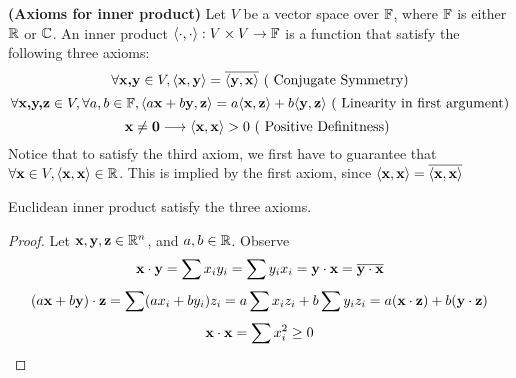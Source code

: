 \documentclass{report}
\begin{document}
\begin{axiom}
\label{1.6.6}
\textbf{(Axioms for inner product)} Let $V$ be a vector space over $\mathbb{F}$, where $\mathbb{F}$ is either $\mathbb{R}$ or $\mathbb{C}$. An inner product $\langle \cdot,\cdot \rangle:V\times V\rightarrow \mathbb{F} $ is a function that satisfy the following three axioms: 
\begin{equation}
\forall \textbf{x,y}\in V,\langle \textbf{x},\textbf{y} \rangle=\overline{\langle \textbf{y},\textbf{x} \rangle}\text{ ( Conjugate Symmetry)}
\end{equation}
\begin{equation}
\forall \textbf{x,y,z}\in V, \forall a,b\in\mathbb{F}, \langle a\textbf{x}+b\textbf{y},\textbf{z} \rangle=a\langle \textbf{x},\textbf{z} \rangle+b\langle \textbf{y},\textbf{z} \rangle \text{ ( Linearity in first argument)} 
\end{equation}
\begin{equation}
\textbf{x}\neq \textbf{0}\longrightarrow \langle \textbf{x},\textbf{x} \rangle>0 \text{ ( Positive Definitness) }  
\end{equation}
Notice that to satisfy the third axiom, we first have to guarantee that $\forall \textbf{x}\in V,\langle \textbf{x},\textbf{x} \rangle\in\mathbb{R}$. This is implied by the first axiom, since $\langle \textbf{x},\textbf{x} \rangle=\overline{\langle \textbf{x},\textbf{x} \rangle}$ 
\end{axiom}
\begin{theorem}
\label{1.6.7}
Euclidean inner product satisfy the three axioms. 
\end{theorem}
\begin{proof}
Let $\textbf{x},\textbf{y},\textbf{z}\in\mathbb{R}^n$, and $a,b\in\mathbb{R}$. Observe
\begin{equation}
\textbf{x}\cdot\textbf{y}=\sum x_iy_i=\sum y_ix_i=\textbf{y}\cdot\textbf{x}=\overline{\textbf{y}\cdot\textbf{x}}
\end{equation}
\begin{equation}
  (a\textbf{x}+b\textbf{y})\cdot\textbf{z}=\sum (ax_i+by_i)z_i=a\sum x_iz_i + b\sum y_iz_i=a(\textbf{x}\cdot\textbf{z})+b(\textbf{y}\cdot\textbf{z})
\end{equation}
\begin{equation}
\textbf{x}\cdot\textbf{x}=\sum x_i^2\geq 0
\end{equation}
\end{proof}
\end{document}
